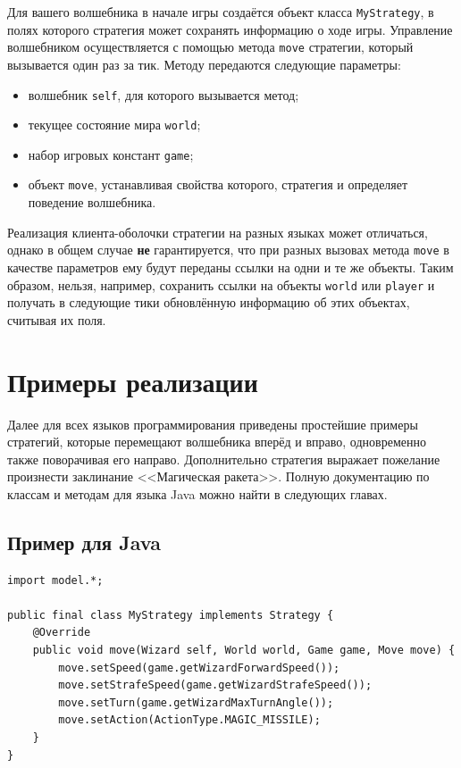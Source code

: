 Для вашего волшебника в начале игры создаётся объект класса \texttt{MyStrategy}, в полях которого стратегия может сохранять информацию о
ходе игры. Управление волшебником осуществляется с помощью метода \texttt{move} стратегии, который вызывается один раз за тик. Методу
передаются следующие параметры:
\begin{itemize}
  \item волшебник \texttt{self}, для которого вызывается метод;
  \item текущее состояние мира \texttt{world};
  \item набор игровых констант \texttt{game};
  \item объект \texttt{move}, устанавливая свойства которого, стратегия и определяет поведение волшебника.
\end{itemize}

Реализация клиента-оболочки стратегии на разных языках может отличаться, однако в общем случае \textbf{не} гарантируется, что при разных
вызовах метода \texttt{move} в качестве параметров ему будут переданы ссылки на одни и те же объекты. Таким образом, нельзя, например,
сохранить ссылки на объекты \texttt{world} или \texttt{player} и получать в следующие тики обновлённую информацию об этих объектах, считывая
их поля.

\newpage
\section{Примеры реализации}

Далее для всех языков программирования приведены простейшие примеры стратегий, которые перемещают волшебника вперёд и вправо, одновременно
также поворачивая его направо. Дополнительно стратегия выражает пожелание произнести заклинание <<Магическая ракета>>. Полную документацию
по классам и методам для языка Java можно найти в следующих главах.

\subsection{Пример для Java}

\begin{verbatim}
import model.*;

public final class MyStrategy implements Strategy {
    @Override
    public void move(Wizard self, World world, Game game, Move move) {
        move.setSpeed(game.getWizardForwardSpeed());
        move.setStrafeSpeed(game.getWizardStrafeSpeed());
        move.setTurn(game.getWizardMaxTurnAngle());
        move.setAction(ActionType.MAGIC_MISSILE);
    }
}
\end{verbatim}


